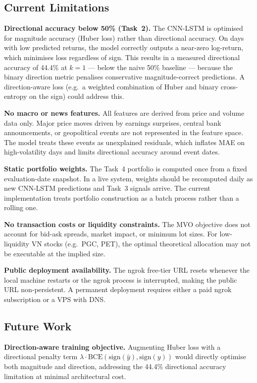 \documentclass[12pt, a4paper]{article}
\begin{document}
\subsection{Current Limitations}

\textbf{Directional accuracy below 50\% (Task~2).}
The CNN-LSTM is optimised for magnitude accuracy (Huber loss) rather
than directional accuracy. On days with low predicted returns, the
model correctly outputs a near-zero log-return, which minimises loss
regardless of sign. This results in a measured directional accuracy
of 44.4\% at $k=1$ --- below the naive 50\% baseline --- because
the binary direction metric penalises conservative magnitude-correct
predictions. A direction-aware loss (e.g.\ a weighted combination of
Huber and binary cross-entropy on the sign) could address this.

\textbf{No macro or news features.}
All features are derived from price and volume data only. Major price
moves driven by earnings surprises, central bank announcements, or
geopolitical events are not represented in the feature space. The model
treats these events as unexplained residuals, which inflates MAE on
high-volatility days and limits directional accuracy around event dates.

\textbf{Static portfolio weights.}
The Task~4 portfolio is computed once from a fixed evaluation-date
snapshot. In a live system, weights should be recomputed daily as
new CNN-LSTM predictions and Task~3 signals arrive. The current
implementation treats portfolio construction as a batch process
rather than a rolling one.

\textbf{No transaction costs or liquidity constraints.}
The MVO objective does not account for bid-ask spreads, market impact,
or minimum lot sizes. For low-liquidity VN stocks (e.g.\ PGC,
PET), the optimal theoretical allocation may not be executable at
the implied size.

\textbf{Public deployment availability.}
The ngrok free-tier URL resets whenever the local machine restarts
or the ngrok process is interrupted, making the public URL
non-persistent. A permanent deployment requires either a paid ngrok
subscription or a VPS with DNS.

\subsection{Future Work}

\textbf{Direction-aware training objective.}
Augmenting Huber loss with a directional penalty term
$\lambda \cdot \text{BCE}(\text{sign}(\hat{y}), \text{sign}(y))$
would directly optimise both magnitude and direction, addressing
the 44.4\% directional accuracy limitation at minimal architectural
cost.
\end{document}
